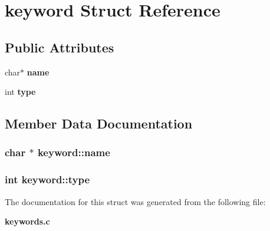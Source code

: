 \section{keyword  Struct Reference}
\label{structkeyword}
\subsection*{Public Attributes}
\begin{CompactItemize}
\item 
char$\ast$ {\bf name}
\item 
int {\bf type}
\end{CompactItemize}


\subsection{Member Data Documentation}
\subsubsection{\setlength{\rightskip}{0pt plus 5cm}char $\ast$ keyword::name}\label{structkeyword_m0}


\subsubsection{\setlength{\rightskip}{0pt plus 5cm}int keyword::type}\label{structkeyword_m1}




The documentation for this struct was generated from the following file:\begin{CompactItemize}
\item 
{\bf keywords.c}\end{CompactItemize}
